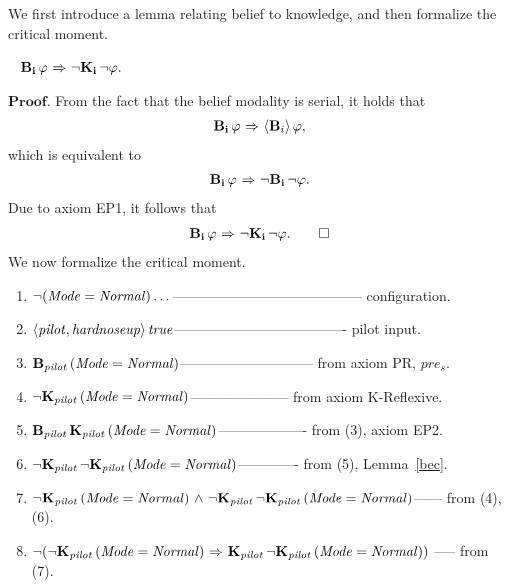 We first introduce a lemma relating belief to knowledge, and then formalize the critical moment.
\begin{lemma}~\label{bec}
	$\mathbf{B}_{\mathbf{i}}\, \varphi {\ \Rightarrow \ } {\neg} \mathbf{K}_{\mathbf{i}}\,{\neg} \varphi.$
\end{lemma}
$\mathbf{Proof}$. From the fact that the belief modality is serial, it holds that
\begin{eqnarray*} \mathbf{B}_{\mathbf{i}}\,\varphi {\ \Rightarrow \ } \langle \mathbf{B}_{i} \rangle\, \varphi,\end{eqnarray*} which is equivalent to \begin{eqnarray*} \mathbf{B}_{\mathbf{i}}\, \varphi {\ \Rightarrow \ } {\neg} \mathbf{B}_{\mathbf{i}}\,{\neg} \varphi. \end{eqnarray*} Due to axiom EP1, it follows that \begin{eqnarray*} \mathbf{B}_{\mathbf{i}}\, \varphi {\ \Rightarrow \ } {\neg} \mathbf{K}_{\mathbf{i}}\,{\neg} \varphi.\qquad\Box \end{eqnarray*} 
%
We now formalize the critical moment.
\begin{tcolorbox}
	\begin{enumerate}
		\item ${\neg} \mathit{(Mode=Normal)} \dots$----------------------------------------- configuration.
		\item $\mathbf{\langle \mathit{pilot}, \mathit{hardnoseup} \rangle}\,\mathit{true}$------------------------------------- pilot input.
		\item $\mathbf{B}_{\mathbf{\mathit{pilot}}}\,(\mathit{Mode=Normal})$----------------------------- from axiom PR, $\mathit{pre_s}$.
		\item ${\neg} \mathbf{K}_{\mathbf{\mathit{pilot}}}\,(\mathit{Mode=Normal})$--------------------- from axiom K-Reflexive.
		\item $\mathbf{B}_{\mathbf{\mathit{pilot}}}\,\mathbf{K}_{\mathbf{\mathit{pilot}}}\,(\mathit{Mode=Normal})$------------------- from (3), axiom EP2.
		\item ${\neg} \mathbf{K}_{\mathbf{\mathit{pilot}}}\, {\neg} \mathbf{K}_{\mathbf{\mathit{pilot}}}\,(\mathit{Mode=Normal})$------------- from (5), Lemma~\ref{bec}.
		\item ${\neg} \mathbf{K}_{\mathbf{\mathit{pilot}}}\,(\mathit{Mode=Normal}) {\ \wedge \ } {\neg} \mathbf{K}_{\mathbf{\mathit{pilot}}}\, {\neg} \mathbf{K}_{\mathbf{\mathit{pilot}}}\,(\mathit{Mode=Normal})$------ from (4), (6).
		\item ${\neg}({\neg} \mathbf{K}_{\mathbf{\mathit{pilot}}}\,(\mathit{Mode=Normal}) {\ \Rightarrow \ } \mathbf{K}_{\mathbf{\mathit{pilot}}}\, {\neg} \mathbf{K}_{\mathbf{\mathit{pilot}}}\,(\mathit{Mode=Normal}))$ ----- from (7).
	\end{enumerate}
\end{tcolorbox}
